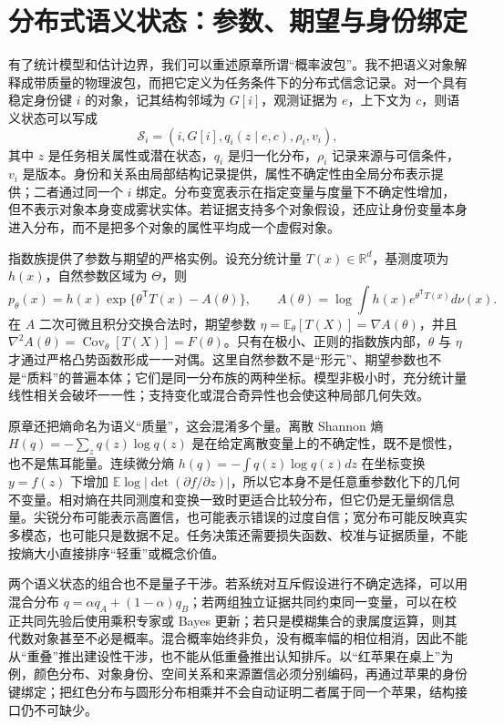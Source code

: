 \section{分布式语义状态：参数、期望与身份绑定}
\label{sec:semantion_revisited_probability_wavepacket}

有了统计模型和估计边界，我们可以重述原章所谓“概率波包”。我不把语义对象解释成带质量的物理波包，而把它定义为任务条件下的分布式信念记录。对一个具有稳定身份键 $i$ 的对象，记其结构邻域为 $G[i]$，观测证据为 $e$，上下文为 $c$，则语义状态可以写成
\begin{equation}
    \mathcal S_i=(i,G[i],q_i(z\mid e,c),\rho_i,v_i),
\end{equation}
其中 $z$ 是任务相关属性或潜在状态，$q_i$ 是归一化分布，$\rho_i$ 记录来源与可信条件，$v_i$ 是版本。身份和关系由局部结构记录提供，属性不确定性由全局分布表示提供；二者通过同一个 $i$ 绑定。分布变宽表示在指定变量与度量下不确定性增加，但不表示对象本身变成雾状实体。若证据支持多个对象假设，还应让身份变量本身进入分布，而不是把多个对象的属性平均成一个虚假对象。

指数族提供了参数与期望的严格实例。设充分统计量 $T(x)\in\mathbb R^d$，基测度项为 $h(x)$，自然参数区域为 $\Theta$，则
\begin{equation}
    p_\theta(x)=h(x)\exp\{\theta^{\mathsf T}T(x)-A(\theta)\},
    \qquad
    A(\theta)=\log\int h(x)e^{\theta^{\mathsf T}T(x)}d\nu(x).
\end{equation}
在 $A$ 二次可微且积分交换合法时，期望参数 $\eta=\mathbb E_\theta[T(X)]=\nabla A(\theta)$，并且 $\nabla^2A(\theta)=\operatorname{Cov}_\theta[T(X)]=F(\theta)$。只有在极小、正则的指数族内部，$\theta$ 与 $\eta$ 才通过严格凸势函数形成一一对偶。这里自然参数不是“形元”、期望参数也不是“质料”的普遍本体；它们是同一分布族的两种坐标。模型非极小时，充分统计量线性相关会破坏一一性；支持变化或混合奇异性也会使这种局部几何失效。

原章还把熵命名为语义“质量”，这会混淆多个量。离散 Shannon 熵 $H(q)=-\sum_zq(z)\log q(z)$ 是在给定离散变量上的不确定性，既不是惯性，也不是焦耳能量。连续微分熵 $h(q)=-\int q(z)\log q(z)dz$ 在坐标变换 $y=f(z)$ 下增加 $\mathbb E\log|\det(\partial f/\partial z)|$，所以它本身不是任意重参数化下的几何不变量。相对熵在共同测度和变换一致时更适合比较分布，但它仍是无量纲信息量。尖锐分布可能表示高置信，也可能表示错误的过度自信；宽分布可能反映真实多模态，也可能只是数据不足。任务决策还需要损失函数、校准与证据质量，不能按熵大小直接排序“轻重”或概念价值。

两个语义状态的组合也不是量子干涉。若系统对互斥假设进行不确定选择，可以用混合分布 $q=\alpha q_A+(1-\alpha)q_B$；若两组独立证据共同约束同一变量，可以在校正共同先验后使用乘积专家或 Bayes 更新；若只是模糊集合的隶属度运算，则其代数对象甚至不必是概率。混合概率始终非负，没有概率幅的相位相消，因此不能从“重叠”推出建设性干涉，也不能从低重叠推出认知排斥。以“红苹果在桌上”为例，颜色分布、对象身份、空间关系和来源置信必须分别编码，再通过苹果的身份键绑定；把红色分布与圆形分布相乘并不会自动证明二者属于同一个苹果，结构接口仍不可缺少。

